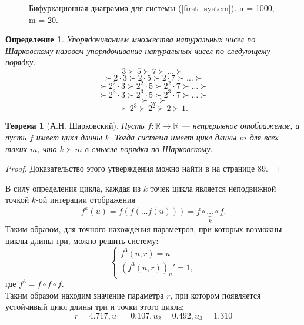 \documentclass[10pt]{article}
\newtheorem{theorem}{Теорема}
\newtheorem{definition}{Определение}
\numberwithin{equation}{section}
\begin{document}
\begin{figure}[h]
	\caption{Бифуркационная диаграмма для системы (\ref{first_system}). n = 1000, m  = 20.}
\end{figure}

\begin{definition}
	Упорядочиванием множества натуральных чисел по Шарковскому назовем упорядочивание натуральных чисел по следующему порядку:
	\[ 3 \succ 5 \succ 7 \succ \dots \succ \]
	\[\succ 2\cdot 3 \succ 2\cdot 5 \succ 2 \cdot 7 \succ \dots \succ \]
	\[\succ 2^2\cdot 3 \succ 2^2\cdot 5 \succ 2^2 \cdot 7 \succ \dots \succ \]
	\[\succ 2^3\cdot 3 \succ 2^3\cdot 5 \succ 2^3 \cdot 7 \succ \dots \succ \]	
	\[\succ \dots \succ \]
	\[\succ 2^3 \succ 2^2 \succ 2 \succ 1.\]
\end{definition} 

\begin{theorem}[А.Н. Шарковский]
	Пусть \( f : \mathbb{R} \to \mathbb{R} \) --- непрерывное отображение, и пусть \( f \) имеет цикл длины \( k \). Тогда система имеет цикл длины \( m \) для всех таких \( m \), что \( k \succ m \) в смысле порядка по Шарковскому. 
\end{theorem}
\begin{proof}
	Доказательство этого утверждения можно найти в \cite{1} на странице 89.
\end{proof}
	

В силу определения цикла, каждая из \( k \) точек цикла является неподвижной точкой \( k \)-ой интерации отображения
\[ f^k(u) = f(f(\dots f(u))) = \underbrace{f \circ \dots \circ f}_k. \]
Таким образом, для точного нахождения параметров, при которых возможны циклы длины три, можно решить систему:
\[ \begin{cases} f^3(u,r) = u \\ (f^3(u,r))_u' = 1, \end{cases}\]
где \( f^3 = f \circ f \circ f . \)\\
Таким образом находим значение параметра \( r \), при котором появляется устойчивый цикл длины три и точки этого цикла:
\[ r = 4.717, u_1 = 0.107, u_2 = 0.492, u_3 = 1.310 \]
\end{document}
